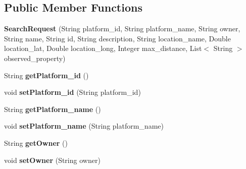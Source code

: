 \subsection*{Public Member Functions}
\begin{DoxyCompactItemize}
\item 
{\bfseries Search\+Request} (String platform\+\_\+id, String platform\+\_\+name, String owner, String name, String id, String description, String location\+\_\+name, Double location\+\_\+lat, Double location\+\_\+long, Integer max\+\_\+distance, List$<$ String $>$ observed\+\_\+property)\hypertarget{classeu_1_1h2020_1_1symbiote_1_1query_1_1SearchRequest_a3542fa8f475209e293d35ce5a6d3922f}{}\label{classeu_1_1h2020_1_1symbiote_1_1query_1_1SearchRequest_a3542fa8f475209e293d35ce5a6d3922f}

\item 
String {\bfseries get\+Platform\+\_\+id} ()\hypertarget{classeu_1_1h2020_1_1symbiote_1_1query_1_1SearchRequest_ae4a375a18e472d125ae59c6d21ce2706}{}\label{classeu_1_1h2020_1_1symbiote_1_1query_1_1SearchRequest_ae4a375a18e472d125ae59c6d21ce2706}

\item 
void {\bfseries set\+Platform\+\_\+id} (String platform\+\_\+id)\hypertarget{classeu_1_1h2020_1_1symbiote_1_1query_1_1SearchRequest_a2dad4ea31087b03d9362c459b818f529}{}\label{classeu_1_1h2020_1_1symbiote_1_1query_1_1SearchRequest_a2dad4ea31087b03d9362c459b818f529}

\item 
String {\bfseries get\+Platform\+\_\+name} ()\hypertarget{classeu_1_1h2020_1_1symbiote_1_1query_1_1SearchRequest_a2802002b4a55158842805611dfda58e8}{}\label{classeu_1_1h2020_1_1symbiote_1_1query_1_1SearchRequest_a2802002b4a55158842805611dfda58e8}

\item 
void {\bfseries set\+Platform\+\_\+name} (String platform\+\_\+name)\hypertarget{classeu_1_1h2020_1_1symbiote_1_1query_1_1SearchRequest_aae4453d7d3ae14888e773647a153c839}{}\label{classeu_1_1h2020_1_1symbiote_1_1query_1_1SearchRequest_aae4453d7d3ae14888e773647a153c839}

\item 
String {\bfseries get\+Owner} ()\hypertarget{classeu_1_1h2020_1_1symbiote_1_1query_1_1SearchRequest_a734f9cfa7013a2359a6cee120da22360}{}\label{classeu_1_1h2020_1_1symbiote_1_1query_1_1SearchRequest_a734f9cfa7013a2359a6cee120da22360}

\item 
void {\bfseries set\+Owner} (String owner)\hypertarget{classeu_1_1h2020_1_1symbiote_1_1query_1_1SearchRequest_acca5d0888282dce7c86f835439f7ac91}{}\label{classeu_1_1h2020_1_1symbiote_1_1query_1_1SearchRequest_acca5d0888282dce7c86f835439f7ac91}


\end{DoxyCompactItemize}

